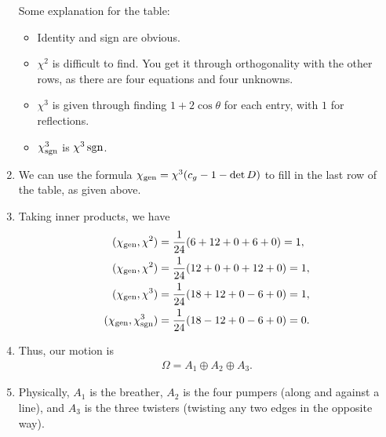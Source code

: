 \documentclass[11pt]{article}
\begin{document}
\begin{eexample}
\begin{enumerate}
\begin{table}[H]
\begin{tabular}{|c|c|c|c|c|c|}
            \end{tabular}
        \end{table}
        Some explanation for the table:
        \begin{itemize}
            \item Identity and sign are obvious.
            \item $\chi^2$ is difficult to find. You get it through orthogonality
            with the other rows, as there are four equations and four unknowns.
            \item $\chi^3$ is given through finding $1 + 2\cos{\theta}$ for each
            entry, with $1$ for reflections.
            \item $\chi^3_{\rm sgn}$ is $\chi^3 \, {\rm sgn}$.
        \end{itemize}
        \item We can use the formula $\chi_{\rm gen} = \chi^3 (c_g - 1 - \det{D})$
        to fill in the last row of the table, as given above.
        \item Taking inner products, we have
        \begin{align*}
            (\chi_{\rm gen}, \chi^2) & = \frac{1}{24} (6 + 12 + 0 + 6 + 0) = 1,\\
            (\chi_{\rm gen}, \chi^2) & = \frac{1}{24} (12 + 0 + 0 + 12 + 0) = 1,\\
            (\chi_{\rm gen}, \chi^3) & = \frac{1}{24} (18 + 12 + 0 - 6 + 0) = 1,\\
            (\chi_{\rm gen}, \chi^3_{\rm sgn}) & = \frac{1}{24} (18 - 12 + 0 - 6 + 0) = 0.
        \end{align*}
        \item Thus, our motion is
        \begin{align*}
            \boxed{\Omega = A_1 \oplus A_2 \oplus A_3.}
        \end{align*}
        \item Physically, $A_1$ is the breather, $A_2$ is the four
        pumpers (along and against a line), and $A_3$ is the three twisters (twisting any
        two edges in the opposite way).
    \end{enumerate}
\end{eexample}
\end{document}
